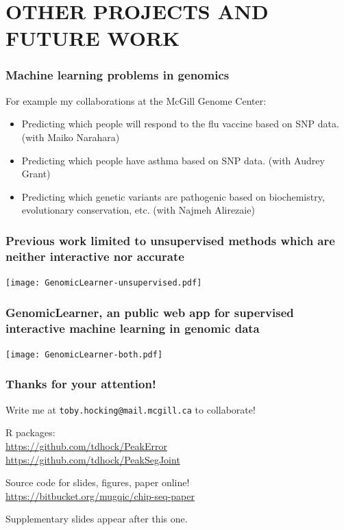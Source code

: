\documentclass{beamer}
\begin{document}
\section{OTHER PROJECTS AND FUTURE WORK}

\begin{frame}
  \frametitle{Machine learning problems in genomics}
  For example my collaborations at the McGill Genome Center:
  \begin{itemize}
  \item Predicting which people will respond to the flu vaccine based
    on SNP data. (with Maiko Narahara)
  \item Predicting which people have asthma based on SNP
    data. (with Audrey Grant)
  \item Predicting which genetic variants are pathogenic based on
    biochemistry, evolutionary conservation, etc. (with
    Najmeh Alirezaie)
  \end{itemize}
\end{frame}

\begin{frame}
  \frametitle{Previous work limited to 
    unsupervised methods
which are neither interactive nor accurate
}
  \texttt{[image: GenomicLearner-unsupervised.pdf]}
\end{frame}

\begin{frame}
  \frametitle{GenomicLearner, an public web app for supervised interactive machine learning in genomic data}
  \texttt{[image: GenomicLearner-both.pdf]}
\end{frame}


\begin{frame}
  \frametitle{Thanks for your attention!}
  Write me at \alert{\texttt{toby.hocking@mail.mcgill.ca}} to collaborate!

  \vskip 1cm

  R packages:\\
  \url{https://github.com/tdhock/PeakError}\\
  \url{https://github.com/tdhock/PeakSegJoint}

  \vskip 1cm

  Source code for slides, figures, paper online!\\
  \small
  \url{https://bitbucket.org/mugqic/chip-seq-paper}
  \vskip 1cm

  Supplementary slides appear after this one.

\end{frame}
\end{document}
